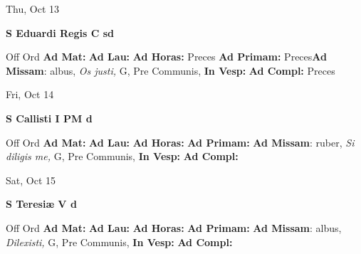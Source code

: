 \documentclass[10pt]{book}
\begin{document}
\begin{center}
\begin{minipage}{3.5in}
\vspace{2em}
\begin{center}Thu, Oct 13
\end{center}
\textbf{ \large S Eduardi Regis C
\textnormal{\normalsize sd}}

\begin{justify}Off Ord
\textbf{Ad Mat: }
\textbf{Ad Lau: }
\textbf{Ad Horas: }Preces
\textbf{Ad Primam: }Preces\textbf{Ad Missam}: albus, \textit{Os justi,} G, Pre Communis, 
\textbf{In Vesp: }
\textbf{Ad Compl: }Preces
\end{justify}
\end{minipage}
\end{center}

\begin{center}
\begin{minipage}{3.5in}
\vspace{2em}
\begin{center}Fri, Oct 14
\end{center}
\textbf{ \large S Callisti I PM
\textnormal{\normalsize d}}

\begin{justify}Off Ord
\textbf{Ad Mat: }
\textbf{Ad Lau: }
\textbf{Ad Horas: }
\textbf{Ad Primam: }\textbf{Ad Missam}: ruber, \textit{Si diligis me,} G, Pre Communis, 
\textbf{In Vesp: }
\textbf{Ad Compl: }
\end{justify}
\end{minipage}
\end{center}

\begin{center}
\begin{minipage}{3.5in}
\vspace{2em}
\begin{center}Sat, Oct 15
\end{center}
\textbf{ \large S Teresiæ V
\textnormal{\normalsize d}}

\begin{justify}Off Ord
\textbf{Ad Mat: }
\textbf{Ad Lau: }
\textbf{Ad Horas: }
\textbf{Ad Primam: }\textbf{Ad Missam}: albus, \textit{Dilexisti,} G, Pre Communis, 
\textbf{In Vesp: }
\textbf{Ad Compl: }
\end{justify}
\end{minipage}
\end{center}
\end{document}
